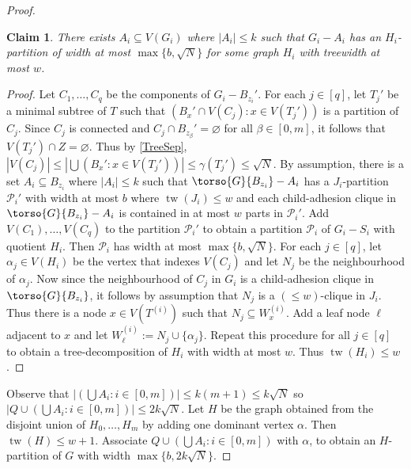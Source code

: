 \documentclass[12pt]{article}
\renewcommand{\emptyset}{\varnothing}
\renewcommand{\leq}{\leqslant}
\DeclareMathOperator{\tw}{tw}
\newcommand{\PP}{\mathcal{P}}
\theoremstyle{plain}
\newtheorem*{claim}{Claim}
\theoremstyle{definition}
\begin{document}
\begin{proof}
     \begin{claim}
        There exists $A_i\subseteq V(G_i)$ where $|A_i|\leq k$ such that $G_i-A_i$ has an $H_i$-partition of width at most $\max\{b,\sqrt{N}\}$ for some graph $H_i$ with treewidth at most $w$.
    \end{claim}
    \begin{proof}
         Let $C_1,\dots, C_q$ be the components of $G_i-B_{z_i}'$. For each $j\in [q]$, let $T_j'$ be a minimal subtree of $T$ such that $(B_x'\cap V(C_j) \colon x\in V(T_j'))$ is a partition of $C_j$. Since $C_j$ is connected and $C_j\cap B_{z_{\beta}}'=\emptyset$ for all $\beta\in [0,m]$, it follows that $V(T_j')\cap Z=\emptyset$. Thus by \cref{TreeSep}, $|V(C_j)|\leq |\bigcup(B_x' \colon x\in V(T_j'))|\leq \gamma(T_j')\leq \sqrt{N}$. By assumption, there is a set $A_i\subseteq B_{z_i}$ where $|A_i|\leq k$ such that $\torso{G}{B_{z_i}}-A_i$ has a $J_i$-partition $\PP_i'$ with width at most $b$ where $\tw(J_i)\leq w$ and each child-adhesion clique in $\torso{G}{B_{z_i}}-A_{i}$ is contained in at most $w$ parts in $\PP_i'$. Add $V(C_1),\dots, V(C_q)$ to the partition $\PP_i'$ to obtain a partition $\PP_i$ of $G_i-S_i$ with quotient $H_i$. Then $\PP_i$ has width at most $\max\{b,\sqrt{N}\}$. For each $j\in [q]$, let $\alpha_j\in V(H_i)$ be the vertex that indexes $V(C_j)$ and let $N_j$ be the neighbourhood of $\alpha_j$. Now since the neighbourhood of $C_j$ in $G_i$ is a child-adhesion clique in $\torso{G}{B_{z_i}}$, it follows by assumption that $N_j$ is a $(\leq w)$-clique in $J_i$. Thus there is a node $x\in V(T^{(i)})$ such that $N_j\subseteq W_x^{(i)}$. Add a leaf node $\ell$ adjacent to $x$ and let $W_{\ell}^{(i)}:=N_j\cup \{\alpha_j\}$. Repeat this procedure for all $j\in [q]$ to obtain a tree-decomposition of $H_i$ with width at most $w$. Thus $\tw(H_i)\leq w$.
    \end{proof}
    Observe that $|(\bigcup A_i:i\in [0,m])|\leq k(m+1)\leq k\sqrt{N}$ so $|Q\cup (\bigcup A_i:i\in [0,m])|\leq 2k\sqrt{N}$. Let $H$ be the graph obtained from the disjoint union of $H_0,\dots, H_m$ by adding one dominant vertex $\alpha$. Then $\tw(H)\leq w+1$. Associate $Q\cup (\bigcup A_i:i\in [0,m])$ with $\alpha$, to obtain an $H$-partition of $G$ with width $\max\{b,2k\sqrt{N}\}$.
\end{proof}
\end{document}
